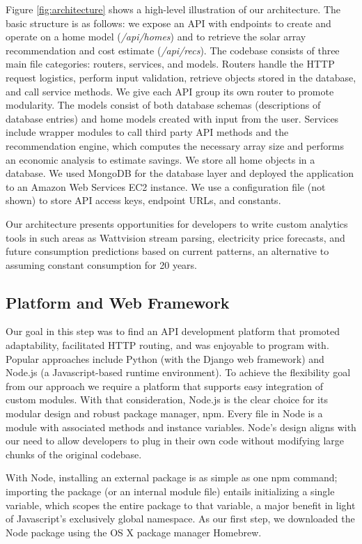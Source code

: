 \documentclass[pageno]{jpaper}
\begin{document}
Figure \ref{fig:architecture} shows a high-level illustration of our architecture. The basic structure is as follows: we expose an API with endpoints to create and operate on a home model ({\em /api/homes}) and to retrieve the solar array recommendation and cost estimate ({\em /api/recs}). The codebase consists of three main file categories: routers, services, and models. Routers handle the HTTP request logistics, perform input validation, retrieve objects stored in the database, and call service methods. We give each API group its own router to promote modularity. The models consist of both database schemas (descriptions of database entries) and home models created with input from the user. Services include wrapper modules to call third party API methods and the recommendation engine, which computes the necessary array size and performs an economic analysis to estimate savings. We store all home objects in a database. We used MongoDB for the database layer and deployed the application to an Amazon Web Services EC2 instance. We use a configuration file (not shown) to store API access keys, endpoint URLs, and constants.

Our architecture presents opportunities for developers to write custom analytics tools in such areas as Wattvision stream parsing, electricity price forecasts, and future consumption predictions based on current patterns, an alternative to assuming constant consumption for 20 years.

\subsection{Platform and Web Framework}
Our goal in this step was to find an API development platform that promoted adaptability, facilitated HTTP routing, and was enjoyable to program with. Popular approaches include Python (with the Django web framework) and Node.js (a Javascript-based runtime environment). To achieve the flexibility goal from our approach we require a platform that supports easy integration of custom modules. With that consideration, Node.js is the clear choice for its modular design and robust package manager, npm. Every file in Node is a module with associated methods and instance variables. Node's design aligns with our need to allow developers to plug in their own code without modifying large chunks of the original codebase.

With Node, installing an external package is as simple as one npm command; importing the package (or an internal module file) entails initializing a single variable, which scopes the entire package to that variable, a major benefit in light of Javascript's exclusively global namespace. As our first step, we downloaded the Node package using the OS X package manager Homebrew.
\end{document}

